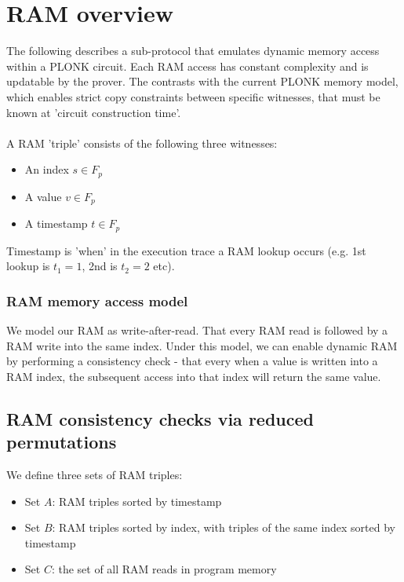 \documentclass[11pt]{article} %
\begin{document}
\section{RAM overview}

The following describes a sub-protocol that emulates dynamic memory access within a PLONK circuit. Each RAM access has constant complexity and is updatable by the prover. The contrasts with the current PLONK memory model, which enables strict copy constraints between specific witnesses, that must be known at 'circuit construction time'.
\\
\\
A RAM 'triple' consists of the following three witnesses:

\begin{itemize}
	\item An index $s \in F_p$
	\item A value $v \in F_p$
	\item A timestamp $t \in F_p$
\end{itemize}

Timestamp is 'when' in the execution trace a RAM lookup occurs (e.g. 1st lookup is $t_1 = 1$, 2nd is $t_2 = 2$ etc).

\subsubsection{RAM memory access model}

We model our RAM as write-after-read. That every RAM read is followed by a RAM write into the same index. %
Under this model, we can enable dynamic RAM by performing a consistency check - that every when a value is written into a RAM index, the subsequent access into that index will return the same value.

\subsection{RAM consistency checks via reduced permutations}

We define three sets of RAM triples:

\begin{itemize}
	\item Set $A$: RAM triples sorted by timestamp
	\item Set $B$: RAM triples sorted by index, with triples of the same index sorted by timestamp
	\item Set $C$: the set of all RAM reads in program memory
\end{itemize}
\end{document}
